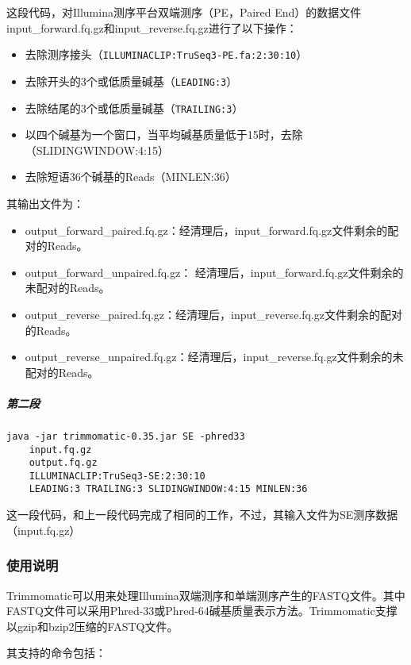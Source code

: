 这段代码，对Illumina测序平台双端测序（PE，Paired End）的数据文件input\_forward.fq.gz和input\_reverse.fq.gz进行了以下操作：

\begin{itemize}
	\item 去除测序接头（\texttt{ILLUMINACLIP:TruSeq3-PE.fa:2:30:10}）
	\item 去除开头的3个或低质量碱基（\texttt{LEADING:3}）
	\item 去除结尾的3个或低质量碱基（\texttt{TRAILING:3}）
	\item 以四个碱基为一个窗口，当平均碱基质量低于15时，去除（SLIDINGWINDOW:4:15）
	\item 去除短语36个碱基的Reads（MINLEN:36）
\end{itemize}

其输出文件为：
\begin{itemize}
	\item output\_forward\_paired.fq.gz：经清理后，input\_forward.fq.gz文件剩余的配对的Reads。
	\item output\_forward\_unpaired.fq.gz： 经清理后，input\_forward.fq.gz文件剩余的未配对的Reads。
	\item output\_reverse\_paired.fq.gz：经清理后，input\_reverse.fq.gz文件剩余的配对的Reads。
	\item output\_reverse\_unpaired.fq.gz：经清理后，input\_reverse.fq.gz文件剩余的未配对的Reads。
\end{itemize}

\subparagraph{第二段}

\begin{verbatim}
java -jar trimmomatic-0.35.jar SE -phred33 
    input.fq.gz 
    output.fq.gz 
    ILLUMINACLIP:TruSeq3-SE:2:30:10 
    LEADING:3 TRAILING:3 SLIDINGWINDOW:4:15 MINLEN:36
\end{verbatim}

这一段代码，和上一段代码完成了相同的工作，不过，其输入文件为SE测序数据（input.fq.gz）

\subsubsection{使用说明}

Trimmomatic可以用来处理Illumina双端测序和单端测序产生的FASTQ文件。其中FASTQ文件可以采用Phred-33或Phred-64碱基质量表示方法。Trimmomatic支撑以gzip和bzip2压缩的FASTQ文件。

其支持的命令包括：

